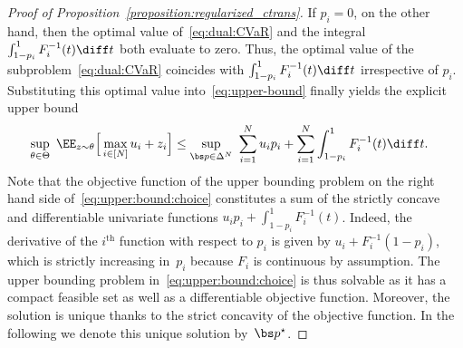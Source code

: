 \documentclass[11pt, a4paper, oneside, reqno]{article}
\begin{document}
\begin{proof}[Proof of Proposition~\ref{proposition:regularized_ctrans}]
    If $p_i = 0$, on the other hand, then the optimal value of~\eqref{eq:dual:CVaR} and the integral $\int_{1-p_i}^1 F_i^{-1}(t) \diff t$ both evaluate to zero. Thus, the optimal value of the subproblem~\eqref{eq:dual:CVaR} coincides with $\int_{1-p_i}^1 F_i^{-1}(t) \diff t$ irrespective of $p_i$. Substituting this optimal value into~\eqref{eq:upper-bound} finally yields the explicit upper bound 
    \begin{align}
        \label{eq:upper:bound:choice}
        \sup_{\theta \in \Theta} ~ \EE_{z \sim \theta} \Big[ \max\limits_{i \in [N]} u_i + z_i \Big] 
        &\leq \sup_{\bs p \in \Delta^N} ~ \sum_{i=1}^N u_i p_i + \sum_{i=1}^N \int_{1-p_i}^1 F_i^{-1}(t) \diff t.
    \end{align}
    Note that the objective function of the upper bounding problem on the right hand side of~\eqref{eq:upper:bound:choice} constitutes a sum of the strictly concave and differentiable univariate functions $u_i p_i + \int_{1-p_i}^1 F_i^{-1}(t)$. Indeed, the derivative of the $i^{\text{th}}$ function with respect to $p_i$ is given by $u_i + F_i^{-1}(1-p_i)$, which is strictly increasing in~$p_i$ because $F_i$ is continuous by assumption. The upper bounding problem in~\eqref{eq:upper:bound:choice} is thus solvable as it has a compact feasible set as well as a differentiable objective function. Moreover, the solution is unique thanks to the strict concavity of the objective function. In the following we denote this unique solution by~$\bs p^\star$.
    

\end{proof}
\end{document}
